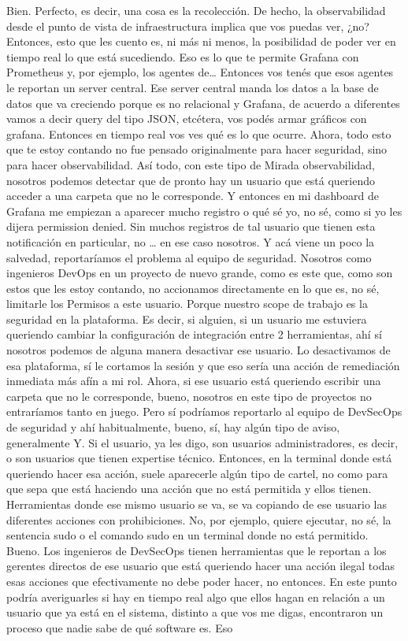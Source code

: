\begin{description}[leftmargin=0cm, labelsep=0.5cm]
    \item[\textbf{VILLARINO PABLO RODOLFO:}] Bien. Perfecto, es decir, una cosa es la recolección. De hecho, la observabilidad desde el punto de vista de infraestructura implica que vos puedas ver, ¿no? Entonces, esto que les cuento es, ni más ni menos, la posibilidad de poder ver en tiempo real lo que está sucediendo. Eso es lo que te permite Grafana con Prometheus y, por ejemplo, los agentes de… Entonces vos tenés que esos agentes le reportan un server central. Ese server central manda los datos a la base de datos que va creciendo porque es no relacional y Grafana, de acuerdo a diferentes vamos a decir query del tipo JSON, etcétera, vos podés armar gráficos con grafana. Entonces en tiempo real vos ves qué es lo que ocurre. Ahora, todo esto que te estoy contando no fue pensado originalmente para hacer seguridad, sino para hacer observabilidad. Así todo, con este tipo de Mirada observabilidad, nosotros podemos detectar que de pronto hay un usuario que está queriendo acceder a una carpeta que no le corresponde. Y entonces en mi dashboard de Grafana me empiezan a aparecer mucho registro o qué sé yo, no sé, como si yo les dijera permission denied. Sin muchos registros de tal usuario que tienen esta notificación en particular, no … en ese caso nosotros. Y acá viene un poco la salvedad, reportaríamos el problema al equipo de seguridad. Nosotros como ingenieros DevOps en un proyecto de nuevo grande, como es este que, como son estos que les estoy contando, no accionamos directamente en lo que es, no sé, limitarle los Permisos a este usuario. Porque nuestro scope de trabajo es la seguridad en la plataforma. Es decir, si alguien, si un usuario me estuviera queriendo cambiar la configuración de integración entre 2 herramientas, ahí sí nosotros podemos de alguna manera desactivar ese usuario. Lo desactivamos de esa plataforma, sí le cortamos la sesión y que eso sería una acción de remediación inmediata más afín a mi rol. Ahora, si ese usuario está queriendo escribir una carpeta que no le corresponde, bueno, nosotros en este tipo de proyectos no entraríamos tanto en juego. Pero sí podríamos reportarlo al equipo de DevSecOps de seguridad y ahí habitualmente, bueno, sí, hay algún tipo de aviso, generalmente Y. Si el usuario, ya les digo, son usuarios administradores, es decir, o son usuarios que tienen expertise técnico. Entonces, en la terminal donde está queriendo hacer esa acción, suele aparecerle algún tipo de cartel, no como para que sepa que está haciendo una acción que no está permitida y ellos tienen. Herramientas donde ese mismo usuario se va, se va copiando de ese usuario las diferentes acciones con prohibiciones. No, por ejemplo, quiere ejecutar, no sé, la sentencia sudo o el comando sudo en un terminal donde no está permitido. Bueno. Los ingenieros de DevSecOps tienen herramientas que le reportan a los gerentes directos de ese usuario que está queriendo hacer una acción ilegal todas esas acciones que efectivamente no debe poder hacer, no entonces. En este punto podría averiguarles si hay en tiempo real algo que ellos hagan en relación a un usuario que ya está en el sistema, distinto a que vos me digas, encontraron un proceso que nadie sabe de qué software es. Eso 
\end{description}
